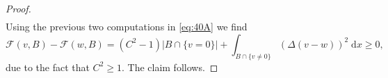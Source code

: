 \documentclass[twoside,11pt]{article}
\theoremstyle{definition}
\begin{document}
\begin{proof}
\begin{align*}
     \end{align*}
     Using the previous two computations in \eqref{eq:40A} we find 
     \begin{equation*}
         \mathcal{F}(v,B)- \mathcal{F}(w,B) = (C^2-1)|B \cap \{ v = 0 \} | +   \int_{B \cap \{ v \neq 0 \} } (\Delta (v-w))^2 \; \mathrm{d}x \geq 0,
      \end{equation*}
      due to the fact that $C^2 \geq 1$. The claim follows. 
\end{proof}

\end{document}
